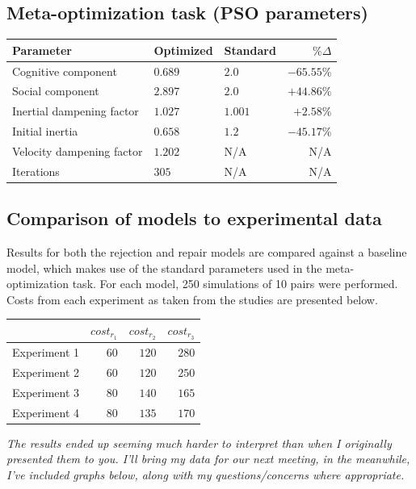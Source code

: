 \documentclass[12pt,a4paper]{article}
\begin{document}
\subsection{Meta-optimization task (PSO parameters)}
\begin{center}
    \begin{tabular}{ l l l r }
    Parameter & Optimized & Standard & $\% \Delta$ \\ \hline
    Cognitive component       & $0.689$ & $2.0$   & $-65.55\%$ \\ \hline
    Social component          & $2.897$ & $2.0$   & $+44.86\%$ \\ \hline
    Inertial dampening factor & $1.027$ & $1.001$ & $+2.58\%$\\ \hline
    Initial inertia           & $0.658$ & $1.2$   & $-45.17\%$ \\ \hline
    Velocity dampening factor & $1.202$ & N/A     & N/A\\ \hline
    Iterations                & $305$   & N/A     & N/A\\ 
    \end{tabular}
\end{center}

\subsection{Comparison of models to experimental data}
Results for both the rejection and repair models are compared against a baseline model, which makes use of the standard parameters used in the meta-optimization task. For each model, 250 simulations of 10 pairs were performed. Costs from each experiment as taken from the \citeauthor{rohde2012} studies are presented below.
\begin{center}
    \begin{tabular}{ l r r r }
     & $cost_{r_1}$ & $cost_{r_2}$ & $cost_{r_3}$ \\ \hline
    Experiment 1 & $60$ & $120$ & $280$ \\ \hline
    Experiment 2 & $60$ & $120$ & $250$ \\ \hline
    Experiment 3 & $80$ & $140$ & $165$ \\ \hline
    Experiment 4 & $80$ & $135$ & $170$ \\ 
    \end{tabular}
\end{center}

\textit{The results ended up seeming much harder to interpret than when I originally presented them to you. I'll bring my data for our next meeting, in the meanwhile, I've included graphs below, along with my questions/concerns where appropriate.}
\end{document}

